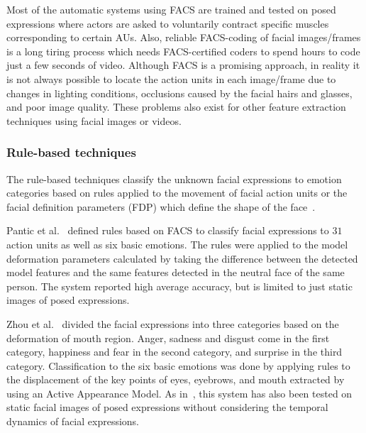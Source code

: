 \documentclass[10pt,journal,cspaper,compsoc]{IEEEtran}
\begin{document}
Most of the automatic systems using FACS are trained and tested on posed expressions where actors are asked to voluntarily contract specific muscles corresponding to certain AUs. Also, reliable FACS-coding of facial images/frames is a long tiring process which needs FACS-certified coders to spend hours to code just a few seconds of video. Although FACS is a promising approach, in reality it is not always possible to locate the action units in each image/frame due to changes in lighting conditions, occlusions caused by the facial hairs and glasses, and poor image quality. These problems also exist for other feature extraction techniques using facial images or videos.

\subsubsection{Rule-based techniques}

The rule-based techniques classify the unknown facial expressions to emotion categories based on rules applied to the movement of facial action units or the facial definition parameters (FDP) which define the shape of the face~\cite{Pandzic02}.

Pantic et al.~\cite{Pantic00} defined rules based on FACS to classify facial expressions to $31$ action units as well as six basic emotions. The rules were applied to the model deformation parameters calculated by taking the difference between the detected model features and the same features detected in the neutral face of the same person. The system reported high average accuracy, but is limited to just static images of posed expressions.

Zhou et al.~\cite{zhou2006facial} divided the facial expressions into three categories based on the deformation of mouth region. Anger, sadness and disgust come in the first category, happiness and fear in the second category, and surprise in the third category. Classification to the six basic emotions was done by applying rules to the displacement of the key points of eyes, eyebrows, and mouth extracted by using an Active Appearance Model. As in~\cite{Pantic00}, this system has also been tested on static facial images of posed expressions without considering the temporal dynamics of facial expressions.
\end{document}
